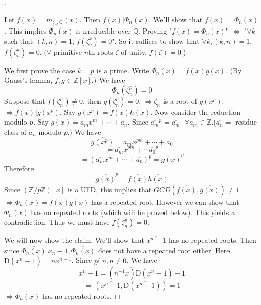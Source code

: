 \documentclass{article}
\newcommand{\sfa}{\text{  } \forall}
\theoremstyle{definition}
\newenvironment{proofs}[1][\proofname]{%
  \begin{proof}[#1]$ $\par\nobreak\ignorespaces
}{%
  \end{proof}
}
\begin{document}
\begin{proofs}
	Let $f(x) = m_{\zeta_n, \mathbb{Q}}(x)$.
	Then $f(x) | \Phi_n(x)$.
	We'll show that $f(x) = \Phi_n(x)$.
	This implies $\Phi_n(x)$ is irreducible over $\mathbb{Q}$.
	Proving "$f(x) = \Phi_n(x)$" $\Leftrightarrow$ "$\forall k$ such that $(k, n) = 1$, $f(\zeta_n^k) = 0$".
	So it suffices to show that $\forall k, (k, n) = 1$, $f(\zeta_n^k) = 0$. ($\forall $ primitive $n$th roots $\zeta$ of unity, $f(\zeta) = 0$.)
	\par We first prove the case $k = p$ is a prime.
	Write $\Phi_n(x) = f(x) g(x)$. (By Gauss's lemma, $f, g \in \mathbb{Z}[x]$.)
	We have
	\[
		\Phi_n(\zeta_n^p) = 0
	\]
	Suppose that $f(\zeta_n^p) \neq 0$, then $g(\zeta_n^p) = 0$.
	$\Rightarrow \zeta_n$ is a root of $g(x^p)$.
	$\Rightarrow f(x) | g(x^p)$.
	Say $g(x^p) = f(x) h(x)$.
	Now consider the reduction modulo $p$.
	Say $g(x) = a_m x^m + \cdots + a_n$.
	Since $\overline{a_m}^p = \overline{a_m} \sfa a_m \in \mathbb{Z}$.($\overline{a_n} = $ residue class of $a_n$ modulo $p$.)
	We have
	\[
		\overline{g(x^p)} = \overline{a_m} x^{pm} + \cdots + \overline{a_0}
	\]
	\[
		= \overline{a_m} x^{pm} + \cdots \overline{a_0}^p
	\]
	\[
		= (\overline{a_m} x^m + \cdots + \overline{a_0})^p = \overline{g(x)}^p
	\]
	Therefore
	\[
		\overline{g(x)}^p = \overline{f(x)}\overline{h(x)}
	\]
	Since $(\mathbb{Z}/p \mathbb{Z})[x]$ is a UFD, this implies that $GCD(\overline{f(x)}, \overline{g(x)}) \neq 1$.
	$\Rightarrow \overline{\Phi_n(x)} = \overline{f(x)} \overline{g(x)}$ has a repeated root.
	However we can show that $\overline{\Phi_n(x)}$ has no repeated roots (which will be proved below).
	This yields a contradiction.
	Thus we must have $f(\zeta_n^p) = 0$.
	\par We will now show the claim.
	We'll show that $\overline{x^n - 1}$ has no repeated roots.
	Then since $\overline{\Phi_n(x)} | \overline{x_n - 1}, \overline{\Phi_n(x)}$ does not have a repeated root either.
	Here $\mathrm{D}(\overline{x^n - 1}) = \overline{n x^{n - 1}}$.
	Since $p \not| \; n, \bar{n} \neq \bar{0}$.
	We have
	\[
		\overline{x^n - 1} = (\overline{n^{-1}x}) \mathrm{D}(\overline{x^n - 1}) - 1
	\]
	\[
		\Rightarrow (\overline{x^n - 1}, \mathrm{D}(\overline{x^n - 1})) = 1
	\]
	$\Rightarrow \overline{\Phi_n(x)}$ has no repeated roots.
\end{proofs}
\end{document}
